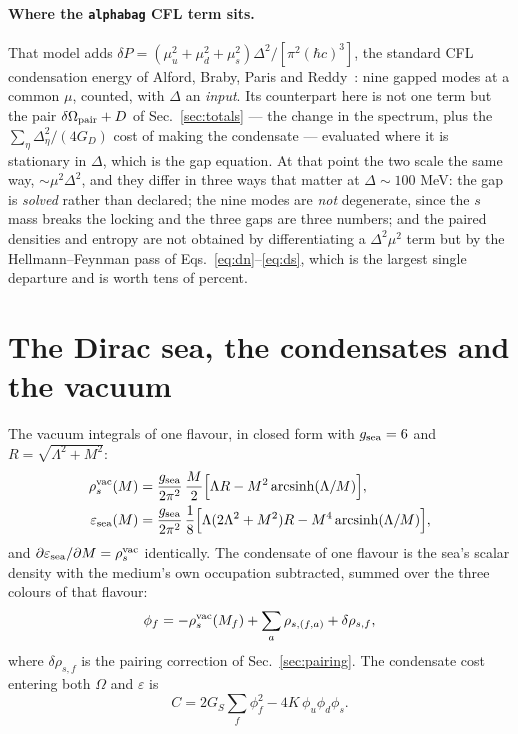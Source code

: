 \documentclass[aps,prc,onecolumn,superscriptaddress,nofootinbib,10pt]{revtex4-2}
\newcommand{\Lam}{\Lambda}
\newcommand{\GS}{G_S}
\newcommand{\GD}{G_D}
\begin{document}
\paragraph{Where the \texttt{alphabag} CFL term sits.} That model adds
$\delta P = (\mu_u^2+\mu_d^2+\mu_s^2)\Delta^2/[\pi^2 (\hbar c)^3]$, the
standard CFL condensation energy of Alford, Braby, Paris and
Reddy~\cite{AlfordBraby2005}: nine gapped modes at a common $\mu$, counted,
with $\Delta$ an \emph{input}. Its counterpart here is not one term but the
pair $\delta\Omega_{\rm pair} + D$ of Sec.~\ref{sec:totals} --- the
change in the spectrum, plus the $\sum_\eta \Delta_\eta^2/(4\GD)$ cost of
making the condensate --- evaluated where it is stationary in $\Delta$, which
is the gap equation. At that point the two scale the same way,
$\sim \mu^2\Delta^2$, and they differ in three ways that matter at
$\Delta \sim 100$ MeV: the gap is \emph{solved} rather than declared; the nine
modes are \emph{not} degenerate, since the $s$ mass breaks the locking and the
three gaps are three numbers; and the paired densities and entropy are not
obtained by differentiating a $\Delta^2\mu^2$ term but by the
Hellmann--Feynman pass of Eqs.~\eqref{eq:dn}--\eqref{eq:ds}, which is the
largest single departure and is worth tens of percent.

\section{The Dirac sea, the condensates and the vacuum}
\label{sec:vacuum}

The vacuum integrals of one flavour, in closed form with $g_{\rm sea} = 6$ and
$R = \sqrt{\Lam^2+M^2}$:
\begin{align}
  \rho_s^{\rm vac}(M) &= \frac{g_{\rm sea}}{2\pi^2}\,\frac{M}{2}
      \Big[ \Lam R - M^2 \operatorname{arcsinh}(\Lam/M) \Big] ,
  \label{eq:seascalar}\\
  \varepsilon_{\rm sea}(M) &= \frac{g_{\rm sea}}{2\pi^2}\,\frac18
      \Big[ \Lam (2\Lam^2+M^2) R - M^4 \operatorname{arcsinh}(\Lam/M) \Big] ,
  \label{eq:seaeps}
\end{align}
and $\partial \varepsilon_{\rm sea}/\partial M = \rho_s^{\rm vac}$ identically.
The condensate of one flavour is the sea's scalar density with the medium's own
occupation subtracted, summed over the three colours of that flavour:
\begin{equation}
  \phi_f = -\rho_s^{\rm vac}(M_f) + \sum_{a} \rho_{s,(f,a)}
           + \delta\rho_{s,f} ,
  \label{eq:phi}
\end{equation}
where $\delta\rho_{s,f}$ is the pairing correction of
Sec.~\ref{sec:pairing}. The condensate cost entering both $\Omega$ and
$\varepsilon$ is
\begin{equation}
  C = 2\GS \sum_f \phi_f^2 - 4K\,\phi_u \phi_d \phi_s .
  \label{eq:C}
\end{equation}
\end{document}
